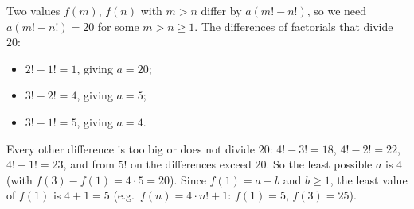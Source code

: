 Two values $f(m)$, $f(n)$ with $m>n$ differ by $a\left(m!-n!\right)$, so we need $a(m!-n!)=20$ for some $m>n\ge1$. The differences of factorials that divide $20$:
\begin{itemize}
\item $2!-1!=1$, giving $a=20$;
\item $3!-2!=4$, giving $a=5$;
\item $3!-1!=5$, giving $a=4$.
\end{itemize}
Every other difference is too big or does not divide $20$: $4!-3!=18$, $4!-2!=22$, $4!-1!=23$, and from $5!$ on the differences exceed $20$. So the least possible $a$ is $4$ (with $f(3)-f(1)=4\cdot5=20$). Since $f(1)=a+b$ and $b\ge1$, the least value of $f(1)$ is $4+1=\boxed{5}$ (e.g.\ $f(n)=4\cdot n!+1$: $f(1)=5$, $f(3)=25$).
